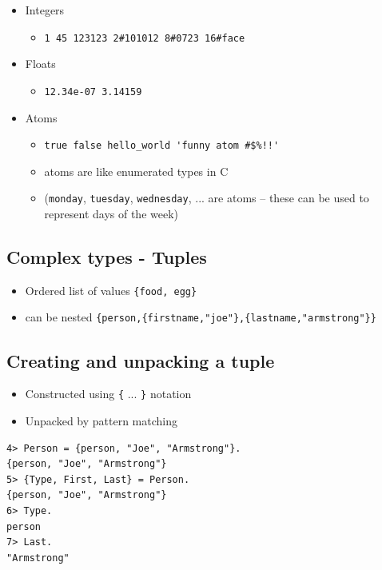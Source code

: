 \documentclass[12pt]{article}
\begin{document}
\begin{itemize}
\item Integers 
\begin{itemize}
\item \verb+1 45 123123 2#101012 8#0723 16#face+
\end{itemize}
\item Floats 
\begin{itemize}
\item \verb+12.34e-07 3.14159+
\end{itemize}
\item Atoms 
\begin{itemize}
\item \verb+true false hello_world 'funny atom #$%!!'+
\item atoms are like enumerated types in C
\item (\verb+monday+, \verb+tuesday+, \verb+wednesday+, ... are atoms -- these can be used
to represent days of the week)
\end{itemize}
\end{itemize}

\subsection{Complex types - Tuples}

\begin{itemize}
\item Ordered list of values
\verb+{food, egg}+
\item can be nested
\verb+{person,{firstname,"joe"},{lastname,"armstrong"}}+
\end{itemize}

\subsection{Creating and unpacking a tuple}

\begin{itemize}
\item Constructed using \verb+{+ ... \verb+}+ notation
\item Unpacked by pattern matching
\end{itemize}

\begin{verbatim}
4> Person = {person, "Joe", "Armstrong"}.
{person, "Joe", "Armstrong"}
5> {Type, First, Last} = Person.
{person, "Joe", "Armstrong"}
6> Type.
person
7> Last.
"Armstrong"
\end{verbatim}
\end{document}
